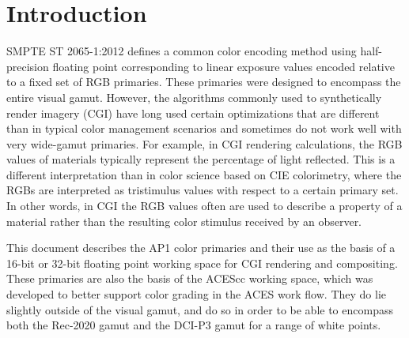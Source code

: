 \unnumberedformat	    %
\chapter{Introduction} 	%

SMPTE ST 2065-1:2012 defines a common color encoding method using half-precision floating point corresponding to linear exposure values encoded relative to a fixed set of RGB primaries. These primaries were designed to encompass the entire visual gamut. However, the algorithms commonly used to synthetically render imagery (CGI) have long used certain optimizations that are different than in typical color management scenarios and sometimes do not work well with very wide-gamut primaries. For example, in CGI rendering calculations, the RGB values of materials typically represent the percentage of light reflected. This is a different interpretation than in color science based on CIE colorimetry, where the RGBs are interpreted as tristimulus values with respect to a certain primary set. In other words, in CGI the RGB values often are used to describe a property of a material rather than the resulting color stimulus received by an observer.

This document describes the AP1 color primaries and their use as the basis of a 16-bit or 32-bit floating point working space for CGI rendering and compositing. These primaries are also the basis of the ACEScc working space, which was developed to better support color grading in the ACES work flow. They do lie slightly outside of the visual gamut, and do so in order to be able to encompass both the Rec-2020 gamut and the DCI-P3 gamut for a range of white points.